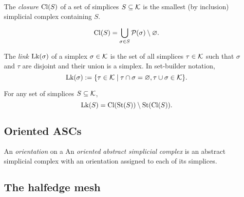 \begin{definition}\label{def:closure}
    \leanok
    The \emph{closure} $\operatorname{Cl}(S)$ of a set of simplices $S \subseteq \mathcal{K}$ is the smallest (by inclusion) simplicial complex containing $S$.
\end{definition}

\begin{lemma}\label{lem:closure_eq_down_closure}
    \[ \operatorname{Cl}(S) = \bigcup_{\sigma \in S} \mathcal{P}(\sigma) \setminus \varnothing. \] %
\end{lemma}

\begin{definition}\label{def:link}
    The \emph{link} $\operatorname{Lk}(\sigma)$ of a simplex $\sigma \in \mathcal{K}$ is the set of all simplices $\tau \in \mathcal{K}$ such that $\sigma$ and $\tau$ are disjoint and their union is a simplex. In set-builder notation,
    \[ \operatorname{Lk}(\sigma) := \{ \tau \in \mathcal{K} \mid \tau \cap \sigma = \varnothing, \tau \cup \sigma \in \mathcal{K} \}. \]
\end{definition}

\begin{lemma}\label{lem:lk_eq_cl_st_sub_st_cl}
    For any set of simplices $S \subseteq \mathcal{K}$, 
    \[ \operatorname{Lk}(S) = \operatorname{Cl}(\operatorname{St}(S)) \setminus \operatorname{St}(\operatorname{Cl}(S)). \]
\end{lemma}

\subsection{Oriented ASCs}
\label{ssec:oriented_ASCs}



\begin{definition}
    An \emph{orientation} on a 
    An \emph{oriented abstract simplicial complex} is an abstract simplicial complex with an orientation assigned to each of its simplices.
\end{definition}

\subsection{The halfedge mesh}
\label{ssec:halfedge_mesh}



